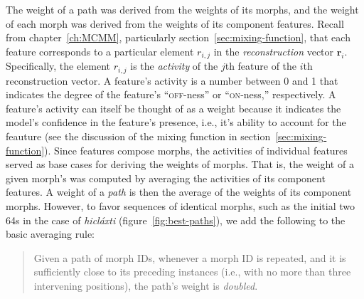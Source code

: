 {The weight of a path was derived from
 the weights of its morphs, and the weight of each morph was derived from the weights of its component features. 
Recall from chapter~\ref{ch:MCMM}, particularly section~\ref{sec:mixing-function}, that each feature corresponds 
to a particular element $r_{i,j}$ in the \emph{reconstruction} 
vector $\mathbf{r}_{i}$. Specifically, the element $r_{i,j}$ is the \emph{activity} 
of the $j$th feature of the $i$th reconstruction vector. A feature's 
activity is a number between 0 and 1 that indicates the degree of the 
feature's ``\textsc{off}-ness'' or ``\textsc{on}-ness,'' respectively. A 
feature's activity can itself be thought of as a weight because it indicates 
the model's confidence in the feature's presence, i.e., it's ability to 
account for the feauture (see the discussion of the mixing function in section~\ref{sec:mixing-function}). 
Since features compose morphs, the activities of individual features served as base cases for deriving the weights of morphs. That is, the weight of a given morph's was computed by averaging the activities of its component features. 
A weight of a \emph{path} is then the average of the weights of its component morphs. However, to favor 
sequences of identical morphs, such as the initial two 64s in the case of \textit{hicl\'{a}xti} (figure~\ref{fig:best-paths}), 
we add the following to the basic averaging rule: 
\begin{quote}\noindent
Given a path of morph IDs, 
whenever a morph ID is repeated, and it is sufficiently close to its preceding instances (i.e., with no more than three intervening positions), the path's weight is \emph{doubled}.
\end{quote}

}
